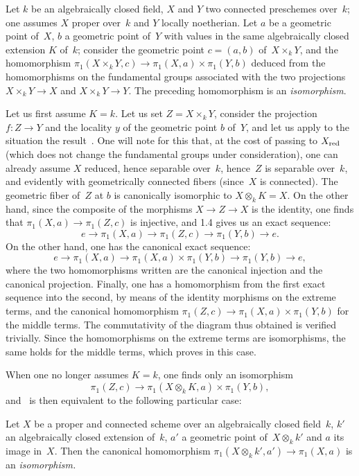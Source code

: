 \begin{corollary}
\label{X.1.7}
Let $k$ be an algebraically closed field, $X$ and $Y$ two
connected preschemes over~$k$; one assumes $X$ proper over~$k$ and
$Y$ locally
noetherian. Let $a$ be a geometric point of~$X$, $b$
a geometric point of~$Y$ with values in the same
algebraically closed extension $K$ of~$k$; consider the
geometric point $c=(a,b)$ of~$X\times_k Y$, and
the homomorphism $\pi_1(X\times_k Y,c)\to \pi_1(X,a)\times\pi_1(Y,b)$
deduced from the homomorphisms on the fundamental groups
associated with the two projections $X\times_k Y\to X$ and $X\times_k
Y\to Y$. The preceding homomorphism is an \emph{isomorphism}.
\end{corollary}

Let us first assume $K=k$. Let us set $Z=X\times_k Y$, consider the
projection $f\colon Z\to Y$ and the locality $y$ of the
geometric point $b$ of~$Y$, and let us apply to the situation the
result~. One will note for this that, at the cost of passing
to $X_{\mathrm{red}}$ (which does not change the fundamental groups
under consideration), one can already assume $X$ reduced, hence
separable over~$k$, hence~$Z$ is separable over~$k$, and
evidently with geometrically connected fibers (since~$X$ is connected). The geometric fiber of~$Z$ at $b$ is
canonically isomorphic to $X\otimes_k K=X$. On the other hand, since the
composite of the morphisms $X\to Z\to X$ is the identity, one finds
that $\pi_1(X,a)\to \pi_1(Z,c)$ is injective, and 1.4 gives us an
exact sequence:
$$
e\to \pi_1(X,a)\to \pi_1(Z,c)\to \pi_1(Y,b)\to e.
$$
On the other hand, one has the canonical exact sequence:
$$
e\to \pi_1(X,a)\to \pi_1(X,a)\times \pi_1(Y,b)\to \pi_1(Y,b)\to e,
$$
where the two homomorphisms written are the canonical injection
and the canonical projection. Finally, one has a homomorphism from the
first exact sequence into the second, by means of the
identity morphisms on the extreme terms, and the canonical
homomorphism $\pi_1(Z,c)\to \pi_1(X,a)\times\pi_1(Y,b)$ for the middle
terms. The commutativity of the diagram thus obtained is
verified trivially. Since the homomorphisms on the extreme
terms are isomorphisms, the same holds for the middle
terms, which proves  in this case.

When one no longer assumes $K=k$, one finds only an isomorphism
$$
\pi_1(Z,c)\to \pi_1(X\otimes_k K,a)\times \pi_1(Y,b),
$$
and~ is then equivalent to the following particular case:

\begin{corollary}
\label{X.1.8}
Let $X$ be a proper and connected scheme over an
algebraically closed field~$k$, $k'$ an algebraically
closed extension of~$k$, $a'$ a geometric point of~$X\otimes_k k'$ and
$a$ its image in~$X$. Then the canonical homomorphism
$\pi_1(X\otimes_k k',a')\to \pi_1(X,a)$ is an \emph{isomorphism.}
\end{corollary}

